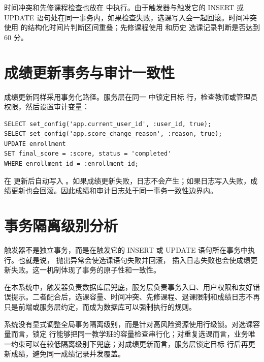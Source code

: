 时间冲突和先修课程检查也放在  中执行。由于触发器与触发它的 INSERT 或 UPDATE 语句处在同一事务内，如果检查失败，选课写入会一起回滚。时间冲突使用  的结构化时间片判断区间重叠；先修课程使用  和历史  选课记录判断是否达到 60 分。

\section{成绩更新事务与审计一致性}

成绩更新同样采用事务化路径。服务层在同一  中锁定目标  行，检查教师或管理员权限，然后设置审计变量：

\begin{lstlisting}[style=sqlstyle]
SELECT set_config('app.current_user_id', :user_id, true);
SELECT set_config('app.score_change_reason', :reason, true);
UPDATE enrollment
SET final_score = :score, status = 'completed'
WHERE enrollment_id = :enrollment_id;
\end{lstlisting}

 在  更新后自动写入 。如果成绩更新失败，日志不会产生；如果日志写入失败，成绩更新也会回滚。因此成绩和审计日志处于同一事务一致性边界内。

\section{事务隔离级别分析}

触发器不是独立事务，而是在触发它的 INSERT 或 UPDATE 语句所在事务中执行。也就是说， 抛出异常会使选课语句失败并回滚， 插入日志失败也会使成绩更新失败。这一机制体现了事务的原子性和一致性。

在本系统中，触发器负责数据库层兜底，服务层负责事务入口、用户权限和友好错误提示。二者配合后，选课容量、时间冲突、先修课程、退课限制和成绩日志不再只是前端或服务层约定，而成为数据库可以强制执行的规则。

系统没有显式调整全局事务隔离级别，而是针对高风险资源使用行级锁。对选课容量而言，锁定  行能够把同一教学班的容量检查串行化；对重复选课而言，业务唯一约束可以在较低隔离级别下兜底；对成绩更新而言，服务层锁定目标  行后再更新成绩，避免同一成绩记录并发覆盖。



